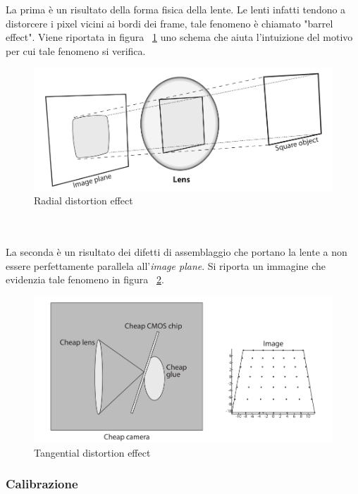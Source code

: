 La prima è un risultato della forma fisica della lente. Le lenti infatti tendono a distorcere i pixel vicini ai bordi dei frame, tale fenomeno è chiamato "barrel effect". Viene riportata in figura ~\ref{fig:calib4} uno schema che aiuta l'intuizione del motivo per cui tale fenomeno si verifica.
\begin{figure}[htpb] 
\centering 
\includegraphics[scale=0.3]{./images/calib4.png} 
\caption{Radial distortion effect} 
\label{fig:calib4}
\end{figure} 
\\ \\
La seconda è un risultato dei difetti di assemblaggio che portano la lente a non essere perfettamente parallela all'\textit{image plane}. Si riporta un immagine che evidenzia tale fenomeno in figura ~\ref{fig:calib5}.
\begin{figure}[htpb] 
\centering 
\includegraphics[scale=0.3]{./images/calib5.png} 
\caption{Tangential distortion effect} 
\label{fig:calib5}
\end{figure} 

\subsubsection{Calibrazione}

